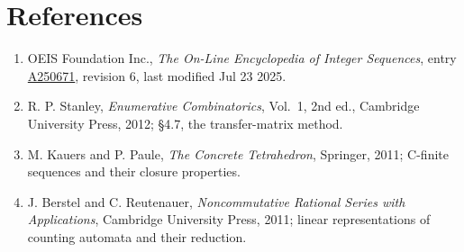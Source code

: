 \documentclass[11pt]{article}
\theoremstyle{definition}
\begin{document}
\section{References}

\begin{enumerate}

\item OEIS Foundation Inc., \emph{The On-Line Encyclopedia of Integer Sequences}, entry \href{https://oeis.org/A250671}{A250671}, revision 6, last modified Jul 23 2025.

\item R. P. Stanley, \emph{Enumerative Combinatorics}, Vol.~1, 2nd ed., Cambridge University Press, 2012; \S4.7, the transfer-matrix method.

\item M. Kauers and P. Paule, \emph{The Concrete Tetrahedron}, Springer, 2011; C-finite sequences and their closure properties.

\item J. Berstel and C. Reutenauer, \emph{Noncommutative Rational Series with Applications}, Cambridge University Press, 2011; linear representations of counting automata and their reduction.

\end{enumerate}
\end{document}
